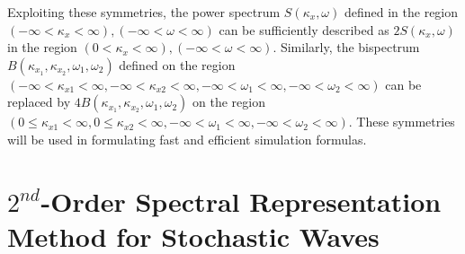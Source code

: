 \documentclass[preprint, review, 12pt]{elsarticle}
\begin{document}
Exploiting these symmetries, the power spectrum $S(\kappa_x, \omega)$ defined in the region $(-\infty < \kappa_{x} < \infty), (-\infty < \omega < \infty)$ can be sufficiently described as $2S(\kappa_x, \omega)$ in the region $(0 < \kappa_{x} < \infty), (-\infty < \omega < \infty)$. Similarly, the bispectrum $B(\kappa_{x_1}, \kappa_{x_2}, \omega_1, \omega_2)$ defined on the region $(-\infty < \kappa_{x1} < \infty, -\infty < \kappa_{x2} < \infty, -\infty < \omega_{1} < \infty, -\infty < \omega_{2} < \infty)$ can be replaced by $4B(\kappa_{x_1}, \kappa_{x_2}, \omega_1, \omega_2)$ on the region $(0 \leq \kappa_{x1} < \infty, 0 \leq \kappa_{x2} < \infty, -\infty < \omega_{1} < \infty, -\infty < \omega_{2} < \infty)$. These symmetries will be used in formulating fast and efficient simulation formulas.

\section{$2^{nd}$-Order Spectral Representation Method for Stochastic Waves}
\end{document}
